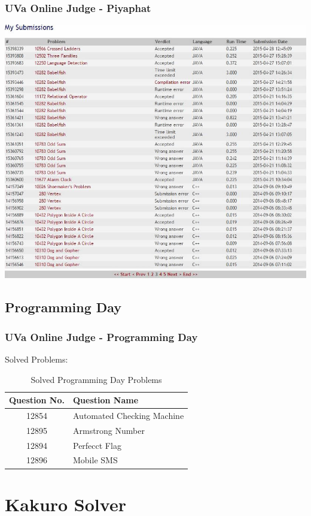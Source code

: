 \documentclass{beamer}
\begin{document}
			\begin{frame}
				\frametitle{UVa Online Judge - Piyaphat}
				\begin{center}
					\includegraphics[scale=0.4]{Submission1-3} 
				\end{center}
			\end{frame}

			\subsection{Programming Day}
			\begin{frame}
				\frametitle{UVa Online Judge - Programming Day}
				Solved Problems:\\
				\begin{table}
					\begin{tabular}{c | l}
						Question No. & Question Name \\
						\hline
						12854 & Automated Checking Machine\\
						12895 & Armstrong Number\\
						12894 & Perfecct Flag\\
						12896 & Mobile SMS
					\end{tabular}
				\caption{Solved Programming Day Problems}
				\end{table}
			\end{frame}



	\section{Kakuro Solver} 
		\begin{frame}
			\sectionpage
		\end{frame}
\end{document}

